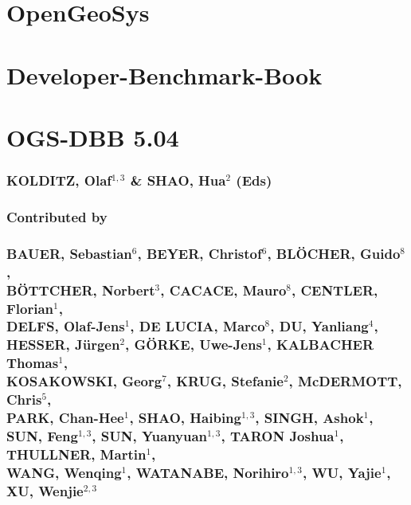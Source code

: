 \documentclass[twoside]{report} %
\begin{document}
\thispagestyle{empty}
\vspace{3cm}
\begin{center}
\section*{OpenGeoSys}
\section*{Developer-Benchmark-Book}
\section*{OGS-DBB 5.04}

\vspace{1cm}
\subsubsection*{KOLDITZ, Olaf$^{1,3}$ \& SHAO, Hua$^{2}$ (Eds)}

\vspace{1cm}
\subsubsection*{Contributed by}

\subsubsection*{
BAUER, Sebastian$^{6}$, BEYER, Christof$^{6}$, BL\"OCHER, Guido$^{8}$, \\[0.75ex]
B\"OTTCHER, Norbert$^{3}$, CACACE, Mauro$^{8}$, CENTLER, Florian$^{1}$, \\[0.75ex]
DELFS, Olaf-Jens$^{1}$, DE LUCIA, Marco$^{8}$, DU, Yanliang$^{4}$, \\[0.75ex]
HESSER, J\"urgen$^{2}$, G\"ORKE, Uwe-Jens$^{1}$, KALBACHER Thomas$^{1}$, \\[0.75ex]
KOSAKOWSKI, Georg$^{7}$, KRUG, Stefanie$^{2}$, McDERMOTT, Chris$^{5}$, \\[0.75ex]
PARK, Chan-Hee$^{1}$, SHAO, Haibing$^{1,3}$, SINGH, Ashok$^{1}$, \\[0.75ex]
SUN, Feng$^{1,3}$, SUN, Yuanyuan$^{1,3}$, TARON Joshua$^{1}$, THULLNER, Martin$^{1}$, \\[0.75ex]
WANG, Wenqing$^{1}$, WATANABE, Norihiro$^{1,3}$, WU, Yajie$^{1}$, \\[0.75ex]
XU, Wenjie$^{2,3}$
}

\end{center}
%
\vspace{1cm}
\end{document}
